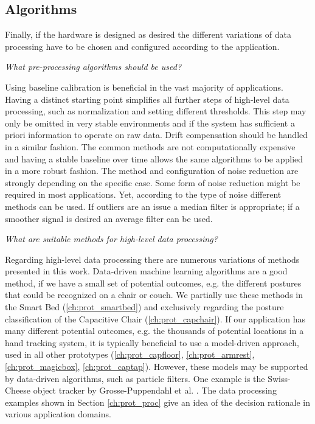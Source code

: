 \subsection{Algorithms}
Finally, if the hardware is designed as desired the different variations of data processing have to be chosen and configured according to the application.

\textit{What pre-processing algorithms should be used?}

Using baseline calibration is beneficial in the vast majority of applications. Having a distinct starting point simplifies all further steps of high-level data processing, such as normalization and setting different thresholds. This step may only be omitted in very stable environments and if the system has sufficient a priori information to operate on raw data. Drift compensation should be handled in a similar fashion. The common methods are not computationally expensive and having a stable baseline over time allows the same algorithms to be applied in a more robust fashion. The method and configuration of noise reduction are strongly depending on the specific case. Some form of noise reduction might be required in most applications. Yet, according to the type of noise different methods can be used. If outliers are an issue a median filter is appropriate; if a smoother signal is desired an average filter can be used. 

\textit{What are suitable methods for high-level data processing?}

Regarding high-level data processing there are numerous variations of methods presented in this work. Data-driven machine learning algorithms are a good method, if we have a small set of potential outcomes, e.g. the different postures that could be recognized on a chair or couch. We partially use these methods in the Smart Bed (\ref{ch:prot_smartbed}) and exclusively regarding the posture classification of the Capacitive Chair (\ref{ch:prot_capchair}). If our application has many different potential outcomes, e.g. the thousands of potential locations in a hand tracking system, it is typically beneficial to use a model-driven approach, used in all other prototypes (\ref{ch:prot_capfloor}, \ref{ch:prot_armrest}, \ref{ch:prot_magicbox}, \ref{ch:prot_captap}). However, these models may be supported by data-driven algorithms, such as particle filters. One example is the Swiss-Cheese object tracker by Grosse-Puppendahl et al. \cite{grosse2013swiss}. The data processing examples shown in Section \ref{ch:prot_proc} give an idea of the decision rationale in various application domains.


